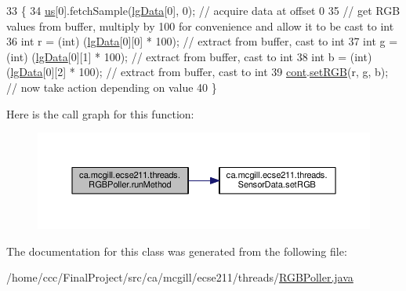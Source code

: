 \begin{DoxyCode}
33                              \{
34     \hyperlink{classca_1_1mcgill_1_1ecse211_1_1threads_1_1_light_poller_ab6a9cb770bbf71f586697633db1475ff}{us}[0].fetchSample(\hyperlink{classca_1_1mcgill_1_1ecse211_1_1threads_1_1_light_poller_a6cf53aecc3efc481f71d36341d2276c6}{lgData}[0], 0); \textcolor{comment}{// acquire data at offset 0}
35     \textcolor{comment}{// get RGB values from buffer, multiply by 100 for convenience and allow it to be cast to int}
36     \textcolor{keywordtype}{int} r = (int) (\hyperlink{classca_1_1mcgill_1_1ecse211_1_1threads_1_1_light_poller_a6cf53aecc3efc481f71d36341d2276c6}{lgData}[0][0] * 100); \textcolor{comment}{// extract from buffer, cast to int}
37     \textcolor{keywordtype}{int} g = (int) (\hyperlink{classca_1_1mcgill_1_1ecse211_1_1threads_1_1_light_poller_a6cf53aecc3efc481f71d36341d2276c6}{lgData}[0][1] * 100); \textcolor{comment}{// extract from buffer, cast to int}
38     \textcolor{keywordtype}{int} b = (int) (\hyperlink{classca_1_1mcgill_1_1ecse211_1_1threads_1_1_light_poller_a6cf53aecc3efc481f71d36341d2276c6}{lgData}[0][2] * 100); \textcolor{comment}{// extract from buffer, cast to int}
39     \hyperlink{classca_1_1mcgill_1_1ecse211_1_1threads_1_1_light_poller_ab6a9050ced4f6940add4735c8872194a}{cont}.\hyperlink{classca_1_1mcgill_1_1ecse211_1_1threads_1_1_sensor_data_a6ad23111ecd378099f0b4ed0b6d398bc}{setRGB}(r, g, b); \textcolor{comment}{// now take action depending on value}
40   \}
\end{DoxyCode}
Here is the call graph for this function\+:
\nopagebreak
\begin{figure}[H]
\begin{center}
\leavevmode
\includegraphics[width=350pt]{classca_1_1mcgill_1_1ecse211_1_1threads_1_1_r_g_b_poller_a96db4561c87136de5098497fe30356fe_cgraph}
\end{center}
\end{figure}


The documentation for this class was generated from the following file\+:\begin{DoxyCompactItemize}
\item 
/home/ccc/\+Final\+Project/src/ca/mcgill/ecse211/threads/\hyperlink{_r_g_b_poller_8java}{R\+G\+B\+Poller.\+java}\end{DoxyCompactItemize}
